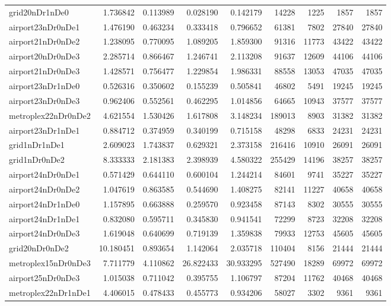 \begin{longtable}{|l|r|r|r|r|r|r|r|r|}
grid20nDr1nDe0 & 1.736842 & 0.113989 & 0.028190 & 0.142179 & 14228 & 1225 & 1857 & 1857 \\
airport23nDr0nDe1 & 1.476190 & 0.463234 & 0.333418 & 0.796652 & 61381 & 7802 & 27840 & 27840 \\
airport21nDr0nDe2 & 1.238095 & 0.770095 & 1.089205 & 1.859300 & 91316 & 11773 & 43422 & 43422 \\
airport20nDr0nDe3 & 2.285714 & 0.866467 & 1.246741 & 2.113208 & 91637 & 12609 & 44106 & 44106 \\
airport21nDr0nDe3 & 1.428571 & 0.756477 & 1.229854 & 1.986331 & 88558 & 13053 & 47035 & 47035 \\
airport23nDr1nDe0 & 0.526316 & 0.350602 & 0.155239 & 0.505841 & 46802 & 5491 & 19245 & 19245 \\
airport23nDr0nDe3 & 0.962406 & 0.552561 & 0.462295 & 1.014856 & 64665 & 10943 & 37577 & 37577 \\
metroplex22nDr0nDe2 & 4.621554 & 1.530426 & 1.617808 & 3.148234 & 189013 & 8903 & 31382 & 31382 \\
airport23nDr1nDe1 & 0.884712 & 0.374959 & 0.340199 & 0.715158 & 48298 & 6833 & 24231 & 24231 \\
grid1nDr1nDe1 & 2.609023 & 1.743837 & 0.629321 & 2.373158 & 216416 & 10910 & 26091 & 26091 \\
grid1nDr0nDe2 & 8.333333 & 2.181383 & 2.398939 & 4.580322 & 255429 & 14196 & 38257 & 38257 \\
airport24nDr0nDe1 & 0.571429 & 0.644110 & 0.600104 & 1.244214 & 84601 & 9741 & 35227 & 35227 \\
airport24nDr0nDe2 & 1.047619 & 0.863585 & 0.544690 & 1.408275 & 82141 & 11227 & 40658 & 40658 \\
airport24nDr1nDe0 & 1.157895 & 0.663888 & 0.259570 & 0.923458 & 87143 & 8302 & 30555 & 30555 \\
airport24nDr1nDe1 & 0.832080 & 0.595711 & 0.345830 & 0.941541 & 72299 & 8723 & 32208 & 32208 \\
airport24nDr0nDe3 & 1.619048 & 0.640699 & 0.719139 & 1.359838 & 79933 & 12753 & 45605 & 45605 \\
grid20nDr0nDe2 & 10.180451 & 0.893654 & 1.142064 & 2.035718 & 110404 & 8156 & 21444 & 21444 \\
metroplex15nDr0nDe3 & 7.711779 & 4.110862 & 26.822433 & 30.933295 & 527490 & 18289 & 69972 & 69972 \\
airport25nDr0nDe3 & 1.015038 & 0.711042 & 0.395755 & 1.106797 & 87204 & 11762 & 40468 & 40468 \\
metroplex22nDr1nDe1 & 4.406015 & 0.478433 & 0.455773 & 0.934206 & 58027 & 3302 & 9361 & 9361 \\

\end{longtable}
